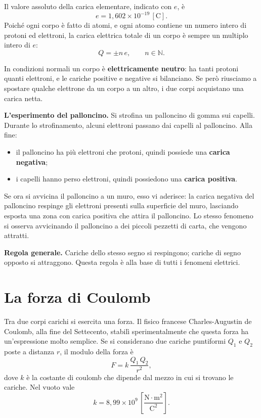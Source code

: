 Il valore assoluto della carica elementare, indicato con \(e\), è
\[
e = 1{,}602 \times 10^{-19}\,[\text{C}].
\]
Poiché ogni corpo è fatto di atomi, e ogni atomo contiene un numero intero di protoni ed elettroni, la carica elettrica totale di un corpo è sempre un multiplo intero di \(e\):
\[
Q = \pm n\,e, \qquad n \in \mathbb{N}.
\]

In condizioni normali un corpo è \textbf{elettricamente neutro}: ha tanti protoni quanti elettroni, e le cariche positive e negative si bilanciano. Se però riusciamo a spostare qualche elettrone da un corpo a un altro, i due corpi acquistano una carica netta.

\begin{esempio}
\textbf{L'esperimento del palloncino.} Si strofina un palloncino di gomma sui capelli. Durante lo strofinamento, alcuni elettroni passano dai capelli al palloncino. Alla fine:
\begin{itemize}[leftmargin=1cm]
  \item il palloncino ha più elettroni che protoni, quindi possiede una \textbf{carica negativa};
  \item i capelli hanno perso elettroni, quindi possiedono una \textbf{carica positiva}.
\end{itemize}
Se ora si avvicina il palloncino a un muro, esso vi aderisce: la carica negativa del palloncino respinge gli elettroni presenti sulla superficie del muro, lasciando esposta una zona con carica positiva che attira il palloncino. Lo stesso fenomeno si osserva avvicinando il palloncino a dei piccoli pezzetti di carta, che vengono attratti.
\end{esempio}

\begin{concetto}
\textbf{Regola generale.} Cariche dello stesso segno si respingono; cariche di segno opposto si attraggono. Questa regola è alla base di tutti i fenomeni elettrici.
\end{concetto}


\section{La forza di Coulomb}


Tra due corpi carichi si esercita una forza. Il fisico francese Charles-Augustin de Coulomb, alla fine del Settecento, stabilì sperimentalmente che questa forza ha un'espressione molto semplice. Se si considerano due cariche puntiformi \(Q_1\) e \(Q_2\) poste a distanza \(r\), il modulo della forza è
\[
F = k\,\frac{Q_1\,Q_2}{r^2},
\]
dove \(k\) è la costante di coulomb che dipende dal mezzo in cui si trovano le cariche. Nel vuoto vale
\[
k = 8{,}99 \times 10^9\,\left[\frac{\text{N}\cdot\text{m}^2}{\text{C}^2}\right].
\]

